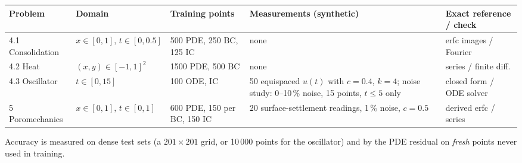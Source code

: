 \documentclass[10pt,a4paper]{article}
\begin{document}
\begin{center}\small
\begin{tabularx}{\linewidth}{@{}l l l X l@{}}
\toprule
Problem & Domain & Training points & Measurements (synthetic) & Exact reference / check \\
\midrule
4.1 Consolidation & $x\!\in\![0,1],\,t\!\in\![0,0.5]$ & 500 PDE, 250 BC, 125 IC & none & erfc images / Fourier \\
4.2 Heat & $(x,y)\!\in\![-1,1]^2$ & 1500 PDE, 500 BC & none & series / finite diff. \\
4.3 Oscillator & $t\!\in\![0,15]$ & 100 ODE, IC & 50 equispaced $u(t)$ with $c\!=\!0.4$, $k\!=\!4$; noise study: 0--10\,\% noise, 15 points, $t\!\le\!5$ only & closed form / ODE solver \\
5 Poromechanics & $x\!\in\![0,1],\,t\!\in\![0,1]$ & 600 PDE, 150 per BC, 150 IC & 20 surface-settlement readings, 1\,\% noise, $c\!=\!0.5$ & derived erfc / series \\
\bottomrule
\end{tabularx}
\end{center}
Accuracy is measured on dense test sets (a $201\times201$ grid, or 10\,000 points for the oscillator) and by
the PDE residual on \emph{fresh} points never used in training.
\end{document}
